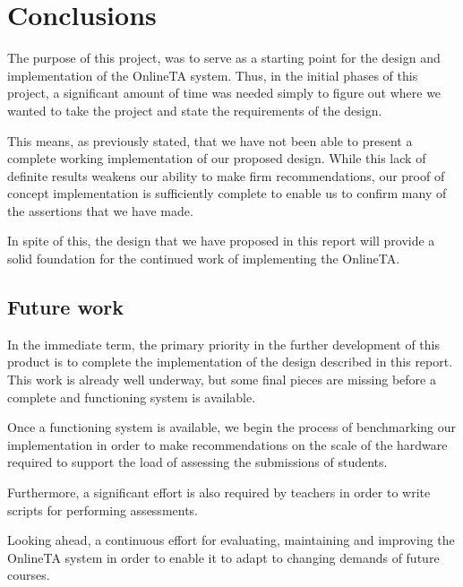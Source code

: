 \chapter{Conclusions}
The purpose of this project, was to serve as a starting point for the
design and implementation of the OnlineTA system. Thus, in the initial
phases of this project, a significant amount of time was needed simply
to figure out where we wanted to take the project and state
the requirements of the design.

This means, as previously stated, that we have not been able to
present a complete working implementation of our proposed
design. While this lack of definite results weakens our ability to
make firm recommendations, our proof of concept implementation is
sufficiently complete to enable us to confirm many of the
assertions that we have made.

In spite of this, the design that we have proposed in this report
will provide a solid foundation for the continued work of implementing
the OnlineTA.


\section{Future work}
In the immediate term, the primary priority in the further development
of this product is to complete the implementation of the design
described in this report. This work is already well underway, but some
final pieces are missing before a complete and functioning system is
available.

Once a functioning system is available, we begin the process of
benchmarking our implementation in order to make recommendations on
the scale of the hardware required to support the load of assessing
the submissions of students.

Furthermore, a significant effort is also required by teachers in
order to write scripts for performing assessments.

Looking ahead, a continuous effort for evaluating, maintaining and
improving the OnlineTA system in order to enable it to adapt to
changing demands of future courses.





